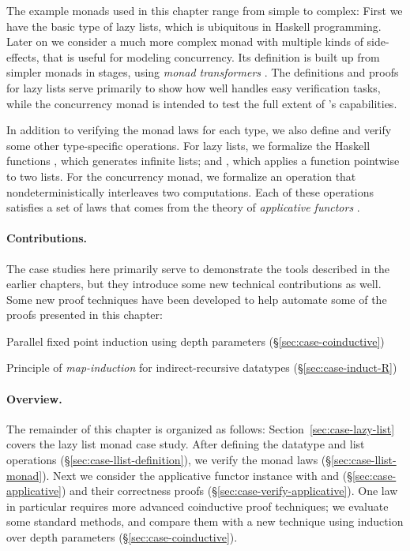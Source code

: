 The example monads used in this chapter range from simple to complex: First we have the basic type of lazy lists, which is ubiquitous in Haskell programming. Later on we consider a much more complex monad with multiple kinds of side-effects, that is useful for modeling concurrency. Its definition is built up from simpler monads in stages, using \emph{monad transformers} \cite{Moggi89, LHJ95}. The definitions and proofs for lazy lists serve primarily to show how well  handles easy verification tasks, while the concurrency monad is intended to test the full extent of 's capabilities.

In addition to verifying the monad laws for each type, we also define and verify some other type-specific operations. For lazy lists, we formalize the Haskell functions , which generates infinite lists; and , which applies a function pointwise to two lists. For the concurrency monad, we formalize an operation that nondeterministically interleaves two computations. Each of these operations satisfies a set of laws that comes from the theory of \emph{applicative functors} \cite{McBride08}.

\paragraph{Contributions.} The case studies here primarily serve to demonstrate the tools described in the earlier chapters, but they introduce some new technical contributions as well. Some new proof techniques have been developed to help automate some of the proofs presented in this chapter:
%
\begin{itemize*}
\item Parallel fixed point induction using depth parameters (\S\ref{sec:case-coinductive})
\item Principle of \emph{map-induction} for indirect-recursive datatypes (\S\ref{sec:case-induct-R})
\end{itemize*}

\paragraph{Overview.} The remainder of this chapter is organized as follows: Section~\ref{sec:case-lazy-list} covers the lazy list monad case study. After defining the datatype and list operations (\S\ref{sec:case-llist-definition}), we verify the monad laws (\S\ref{sec:case-llist-monad}). Next we consider the applicative functor instance with  and  (\S\ref{sec:case-applicative}) and their correctness proofs (\S\ref{sec:case-verify-applicative}). One law in particular requires more advanced coinductive proof techniques; we evaluate some standard methods, and compare them with a new technique using induction over depth parameters (\S\ref{sec:case-coinductive}).


